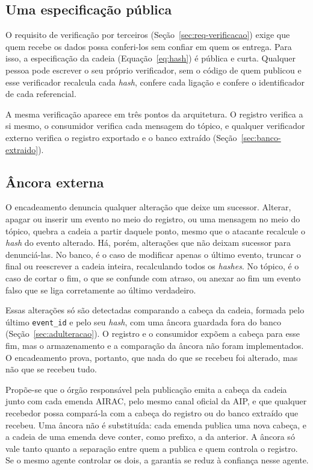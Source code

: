 \subsection{Uma especificação pública}

O requisito de verificação por terceiros (Seção~\ref{sec:req-verificacao}) exige que quem recebe os dados possa conferi-los sem confiar em quem os entrega. Para isso, a especificação da cadeia (Equação~\ref{eq:hash}) é pública e curta. Qualquer pessoa pode escrever o seu próprio verificador, sem o código de quem publicou e esse verificador recalcula cada \textit{hash}, confere cada ligação e confere o identificador de cada referencial.

A mesma verificação aparece em três pontos da arquitetura. O registro verifica a si mesmo, o consumidor verifica cada mensagem do tópico, e qualquer verificador externo verifica o registro exportado e o banco extraído (Seção~\ref{sec:banco-extraido}). 

\subsection{Âncora externa}

O encadeamento denuncia qualquer alteração que deixe um sucessor. Alterar, apagar ou inserir um evento no meio do registro, ou uma mensagem no meio do tópico, quebra a cadeia a partir daquele ponto, mesmo que o atacante recalcule o \textit{hash} do evento alterado. Há, porém, alterações que não deixam sucessor para denunciá-las. No banco, é o caso de modificar apenas o último evento, truncar o final ou reescrever a cadeia inteira, recalculando todos os \textit{hashes}. No tópico, é o caso de cortar o fim, o que se confunde com atraso, ou anexar ao fim um evento falso que se liga corretamente ao último verdadeiro.

Essas alterações só são detectadas comparando a cabeça da cadeia, formada pelo último \texttt{event\_id} e pelo seu \textit{hash}, com uma âncora guardada fora do banco (Seção~\ref{sec:adulteracao}). O registro e o consumidor expõem a cabeça para esse fim, mas o armazenamento e a comparação da âncora não foram implementados. O encadeamento prova, portanto, que nada do que se recebeu foi alterado, mas não que se recebeu tudo.

Propõe-se que o órgão responsável pela publicação emita a cabeça da cadeia junto com cada emenda AIRAC, pelo mesmo canal oficial da AIP, e que qualquer recebedor possa compará-la com a cabeça do registro ou do banco extraído que recebeu. Uma âncora não é substituída: cada emenda publica uma nova cabeça, e a cadeia de uma emenda deve conter, como prefixo, a da anterior. A âncora só vale tanto quanto a separação entre quem a publica e quem controla o registro. Se o mesmo agente controlar os dois, a garantia se reduz à confiança nesse agente.

